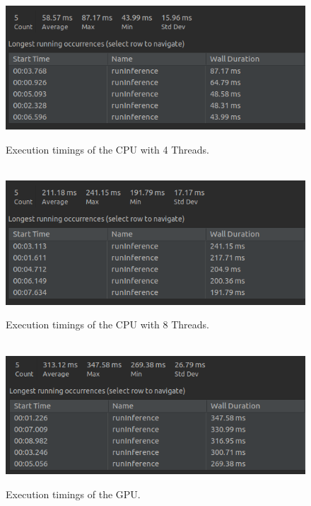 \documentclass[12pt,a4paper]{report}
\begin{document}
\begin{figure}[h]\
    \includegraphics[width=\textwidth]{CPU4_Time.png}
    \caption{Execution timings of the CPU with 4 Threads.}
    \label{fig:cpu4}
\end{figure}

\begin{figure}[h]\
    \includegraphics[width=\textwidth]{CPU8_Time.png}
    \caption{Execution timings of the CPU with 8 Threads.}
    \label{fig:cpu8}
\end{figure}

\begin{figure}[h]\
    \includegraphics[width=\textwidth]{GPU_Time.png}
    \caption{Execution timings of the GPU.}
    \label{fig:gpu}
\end{figure}

\break
\end{document}
